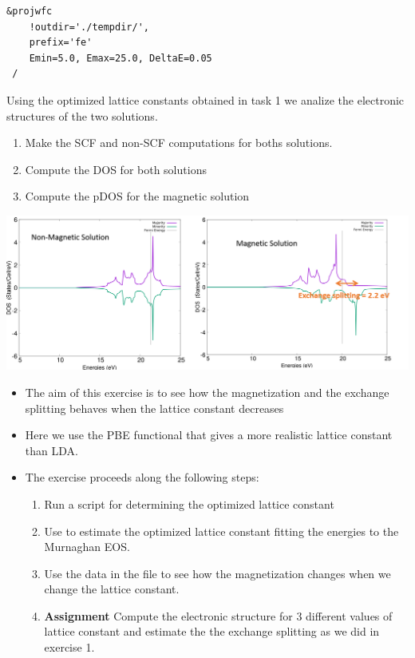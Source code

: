 \documentclass[landscape]{foils}
\begin{document}
\vfill 
\begin{minipage}{14cm}
  \begin{Verbatim}[frame=single, commandchars=\\\{\},fontsize=\small]
 &projwfc
    !outdir='./tempdir/',
    prefix='fe'
    Emin=5.0, Emax=25.0, DeltaE=0.05
 /
  \end{Verbatim}
\end{minipage}
Using the optimized lattice constants obtained in task 1 we analize the electronic 
structures of the  two solutions. 
\begin{enumerate}
  \item Make the SCF and non-SCF computations for boths solutions. 
  \item Compute the  DOS for both solutions
  \item Compute the pDOS for the magnetic solution
\end{enumerate}
\begin{center}
  \includegraphics[width=24cm]{figs/mag_non_mag_DOS.png}
\end{center}
\begin{itemize}
  \item The aim of this exercise is to see how the magnetization and the exchange splitting 
  behaves  when the lattice constant decreases 
  \item Here we use the PBE functional that gives a more realistic lattice constant than LDA. 
  \item The exercise proceeds along  the following steps:
    \begin{enumerate}
      \item Run a script for determining the optimized lattice constant
      \item Use  to estimate the optimized lattice constant fitting the energies
        to the Murnaghan EOS. 
      \item Use the data in the file  to see how the magnetization 
        changes when we change the lattice constant. 
      \item {\bf Assignment} Compute the electronic structure for  3 different values of lattice 
      constant and estimate the the exchange splitting as we did in exercise 1. 
    \end{enumerate}
  \end{itemize} 
\end{document}
